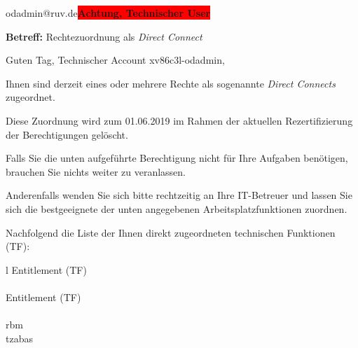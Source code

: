 \documentclass[a4paper,landscape,12pt]{letter}
\begin{document}
\begin{letter}{odadmin@ruv.de\space\space\space\space\space\space\space\space\space\bfseries\colorbox{red}{Achtung, Technischer User}\hfill \break}
\begin{normalsize}
	\opening{\textbf{Betreff:} Rechtezuordnung als \emph{Direct Connect}}
	\begin{normalsize} \hfill
	\end{normalsize}

	\begin{normalsize}
		Guten Tag, 
	Technischer Account xv86c3l-odadmin, \hfill \break
	\end{normalsize}
	\end{normalsize}
	
\begin{normalsize}
	Ihnen sind derzeit eines oder mehrere Rechte als sogenannte \emph{Direct Connects} zugeordnet.
	
	Diese Zuordnung wird zum 01.06.2019 im Rahmen der aktuellen Rezertifizierung der Berechtigungen gelöscht.
	
	Falls Sie die unten aufgeführte Berechtigung nicht für Ihre Aufgaben benötigen, 
	brauchen Sie nichts weiter zu veranlassen.
	
	Anderenfalls wenden Sie sich bitte rechtzeitig an Ihre IT-Betreuer 
	und lassen Sie sich die bestgeeignete der unten angegebenen Arbeitsplatzfunktionen zuordnen.
	\end{normalsize}
	
\begin{normalsize}
	Nachfolgend die Liste der Ihnen direkt zugeordneten technischen Funktionen (TF):

	\begin{longtable}{l}
		Entitlement (TF) \\ \hline
		\endfirsthead
		\\\hline
		Entitlement (TF) \\ \hline
		\endhead %
		\multicolumn{1}{r@{}}{Fortsetzung \ldots}\\
		\endfoot
		\hline
		\endlastfoot
	rbm\\tzabas\\
	\end{longtable}
	\end{normalsize}
	

\end{letter}
\end{document}
